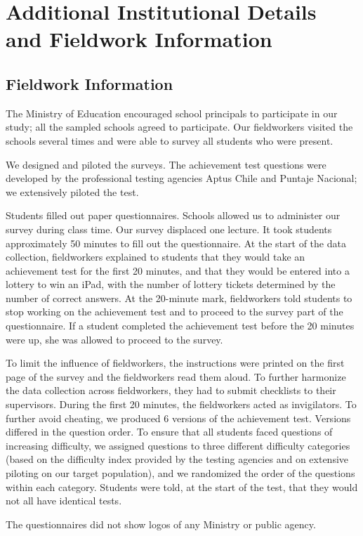 \section{Additional Institutional Details and Fieldwork Information}





\subsection{Fieldwork Information}\label{sec:fieldwork_info}


 The Ministry of Education encouraged school principals to participate in our study; all the sampled schools agreed to participate. Our fieldworkers visited the schools several times and were able to survey all students who were present. \par
We designed and piloted the surveys. The achievement test questions were developed by the professional testing agencies Aptus Chile and Puntaje Nacional; we extensively piloted the test. \par 
Students filled out paper questionnaires. Schools allowed us to administer our survey during class time. Our survey displaced one lecture. It took students approximately 50 minutes to fill out the questionnaire. At the start of the data collection, fieldworkers explained to students that they would take an achievement test for the first 20 minutes, and that they would be entered into a lottery to win an iPad, with the number of lottery tickets determined by the number of correct answers. At the 20-minute mark, fieldworkers told students to stop working on the achievement test and to proceed to the survey part of the questionnaire. If a student completed the achievement test before the 20 minutes were up, she was allowed to proceed to the survey. \par
To limit the influence of fieldworkers, the instructions were printed on the first page of the survey and the fieldworkers read them aloud. To further harmonize the data collection across fieldworkers, they had to submit checklists to their supervisors. During the first 20 minutes, the fieldworkers acted as invigilators. To further avoid cheating, we produced 6 versions of the achievement test. Versions differed in the question order. To ensure that all students faced questions of increasing difficulty, we assigned questions to three different difficulty categories (based on the difficulty index provided by the testing agencies and on extensive piloting on our target population), and we randomized the order of the questions within each category. Students were told, at the start of the test, that they would not all have identical tests.\par

The questionnaires did not show logos of any Ministry or public agency. 

